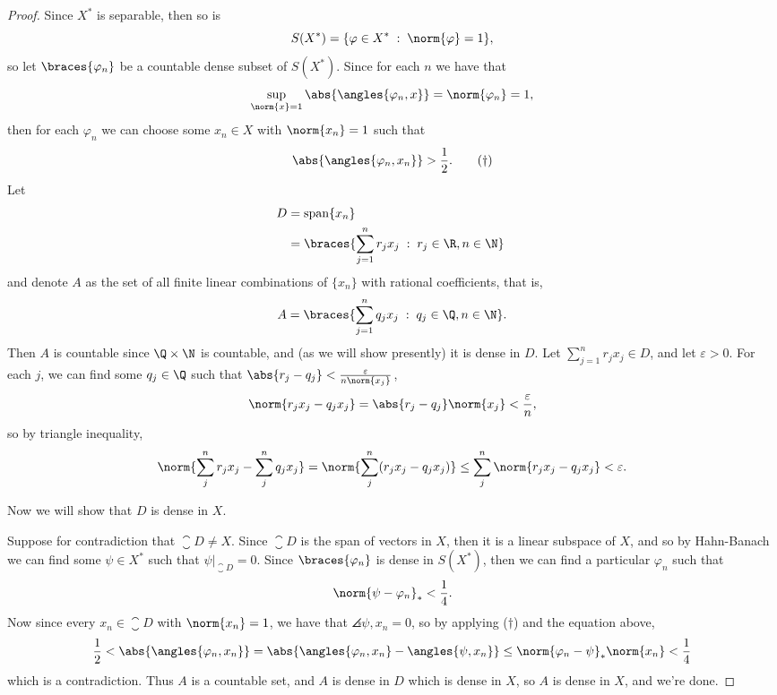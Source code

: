 \documentclass[12pt,letterpaper]{article}
\renewcommand{\phi}{\varphi}
\renewcommand{\epsilon}{\varepsilon}
\begin{document}
\begin{enumerate}
\begin{enumerate}
	\begin{proof}
	Since $X^*$ is separable, then so is 
	$$S(X^*)=\{\phi\in X^* \;:\; \norm{\phi}=1\},$$
	so let $\braces{\phi_n}$ be a countable dense subset of $S(X^*)$. Since for each $n$ we have that 
	$$\sup_{\norm{x}=1} \abs{\angles{\phi_n,x}}=\norm{\phi_n}=1,$$
	then for each $\phi_n$ we can choose some $x_n\in X$ with $\norm{x_n}=1$ such that 
	\begin{equation}
	\abs{\angles{\phi_n,x_n}}>\frac{1}{2}.\tag{$\dagger$}
	\end{equation}
	Let 
	\begin{align*}
	D&=\text{span}\{x_n\}\\
	&=\braces{\sum_{j=1}^n r_jx_j \;:\; r_j\in\R, n\in\N}\phantom{.}
	\end{align*}
	and denote $A$ as the set of all finite linear combinations of $\{x_n\}$ with rational coefficients, that is, 
	$$A=\braces{\sum_{j=1}^n q_jx_j \;:\; q_j\in\Q, n\in\N}.$$
	Then $A$ is countable since $\Q\times\N$ is countable, and (as we will show presently) it is dense in $D$. Let $\sum_{j=1}^n r_jx_j\in D$, and let $\epsilon>0$. For each $j$, we can find some $q_j\in\Q$ such that $\abs{r_j-q_j}<\frac{\epsilon}{n\norm{x_j}}$, 
	$$\norm{r_jx_j-q_jx_j}=\abs{r_j-q_j}\norm{x_j}<\frac{\epsilon}{n},$$
	so by triangle inequality, 
	$$\norm{\sum_j^nr_jx_j-\sum_j^nq_jx_j}=\norm{\sum_j^n(r_jx_j-q_jx_j)}\leq \sum_j^n\norm{r_jx_j-q_jx_j} < \epsilon.$$	
	
	
	
	
	
	Now we will show that $D$ is dense in $X$. 
	
	Suppose for contradiction that 	$\closure{D}\neq X$. Since $\closure{D}$ is the span of vectors in $X$, then it is a linear subspace of $X$, and so by Hahn-Banach we can find some $\psi\in X^*$ such that $\psi|_{\closure{D}}=0$. Since $\braces{\phi_n}$ is dense in $S(X^*)$, then we can find a particular $\phi_n$ such that 
	$$\norm{\psi-\phi_n}_*<\frac{1}{4}.$$
	Now since every $x_n\in\closure{D}$ with $\norm{x_n}=1$, we have that $\angles{\psi,x_n}=0$, so by applying ($\dagger$) and the equation above, 
	$$\frac{1}{2}< \abs{\angles{\phi_n,x_n}} = \abs{\angles{\phi_n,x_n}-\angles{\psi,x_n}}\leq\norm{\phi_n-\psi}_*\norm{x_n} < \frac{1}{4}$$
	which is a contradiction. Thus $A$ is a countable set, and $A$ is dense in $D$ which is dense in $X$, so $A$ is dense in $X$, and we're done. 
	\qedwhitehere
	\end{proof}
	

\end{enumerate}
\end{enumerate}
\end{document}
